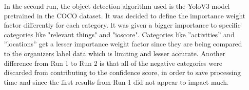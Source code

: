     In the second run, the object detection algorithm used is the YoloV3 model pretrained in the COCO dataset.  It was decided to define the importance weight factor differently for each category. It was given a bigger importance to specific categories like "relevant things" and "ioscore". Categories like ”activities” and ”locations” get a lesser importance weight factor since they are being compared to the organizers label data which is limiting and lesser accurate.  Another difference from Run 1 to Run 2 is that all of the negative categories were discarded from contributing to the confidence score, in order to save processing time and since the first results from Run 1 did not appear to impact much.
    
